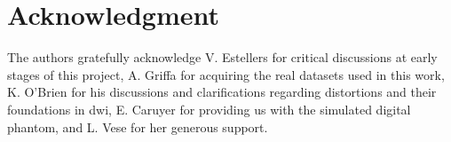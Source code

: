 \section*{Acknowledgment}


The authors gratefully acknowledge V. Estellers for critical discussions 
at early stages of this project, A. Griffa for acquiring the real datasets
used in this work, K. O'Brien for his discussions and clarifications regarding
distortions and their foundations in \gls{dwi}, E. Caruyer for providing us with
the simulated digital phantom, and L. Vese for her generous support.
